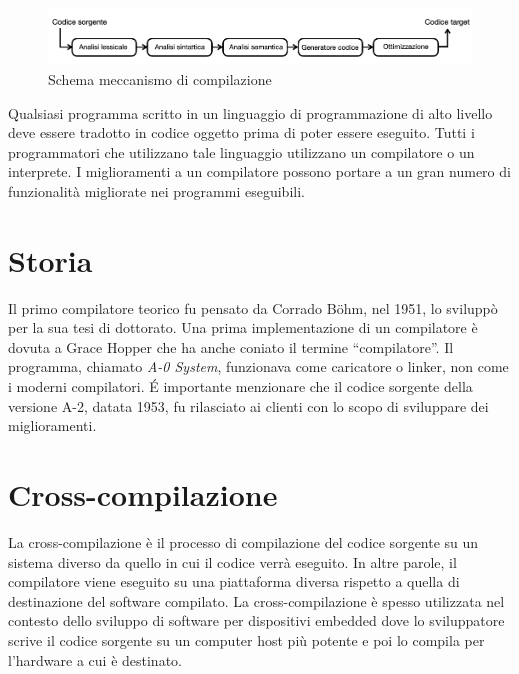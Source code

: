 \documentclass[12pt, a4paper]{report}
\begin{document}
\begin{figure}
\centering
\includegraphics[width = \textwidth]{SchemaCompilatore.png}
\caption{Schema meccanismo di compilazione}
\label{Fig:MeccanismoCompilazione}
\end{figure}

Qualsiasi programma scritto in un linguaggio di programmazione di alto livello deve essere tradotto in codice oggetto prima di poter essere eseguito. Tutti i programmatori che utilizzano tale linguaggio utilizzano un compilatore o un interprete. I miglioramenti a un compilatore possono portare a un gran numero di funzionalità migliorate nei programmi eseguibili.

\section{Storia}
Il primo compilatore teorico fu pensato da Corrado Böhm,  nel 1951, lo sviluppò per la sua tesi di dottorato. Una prima implementazione di un compilatore è dovuta a Grace Hopper che ha anche coniato il termine ``compilatore''. Il programma, chiamato \textit{A-0 System}\cite{SystemA0}, funzionava come caricatore o linker, non come i moderni compilatori. \'E importante menzionare che il codice sorgente della versione A-2, datata 1953, fu rilasciato ai clienti con lo scopo di sviluppare dei miglioramenti. %


\section{Cross-compilazione}
\label{Sec:Cross}
La cross-compilazione è il processo di compilazione del codice sorgente su un sistema diverso da quello in cui il codice verrà eseguito. In altre parole, il compilatore viene eseguito su una piattaforma diversa rispetto a quella di destinazione del software compilato. La cross-compilazione è spesso utilizzata nel contesto dello sviluppo di software per dispositivi embedded dove lo sviluppatore scrive il codice sorgente su un computer host più potente e poi lo compila per l'hardware a cui è destinato.
\end{document}
